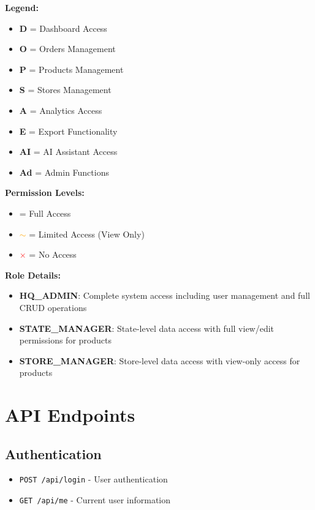 \documentclass[11pt,a4paper]{article}
\begin{document}
\textbf{Legend:}
\begin{itemize}[leftmargin=1cm]
    \item \textbf{D} = Dashboard Access
    \item \textbf{O} = Orders Management  
    \item \textbf{P} = Products Management
    \item \textbf{S} = Stores Management
    \item \textbf{A} = Analytics Access
    \item \textbf{E} = Export Functionality
    \item \textbf{AI} = AI Assistant Access
    \item \textbf{Ad} = Admin Functions
\end{itemize}

\textbf{Permission Levels:}
\begin{itemize}[leftmargin=1cm]
    \item \textcolor{green}{\textbf{\checkmark}} = Full Access
    \item \textcolor{orange}{\textbf{$\sim$}} = Limited Access (View Only)
    \item \textcolor{red}{\textbf{$\times$}} = No Access
\end{itemize}

\textbf{Role Details:}
\begin{itemize}[leftmargin=1cm]
    \item \textbf{HQ\_ADMIN}: Complete system access including user management and full CRUD operations
    \item \textbf{STATE\_MANAGER}: State-level data access with full view/edit permissions for products
    \item \textbf{STORE\_MANAGER}: Store-level data access with view-only access for products
\end{itemize}

\section{API Endpoints}

\subsection{Authentication}
\begin{itemize}[leftmargin=*]
    \item \texttt{POST /api/login} - User authentication
    \item \texttt{GET /api/me} - Current user information
\end{itemize}
\end{document}
